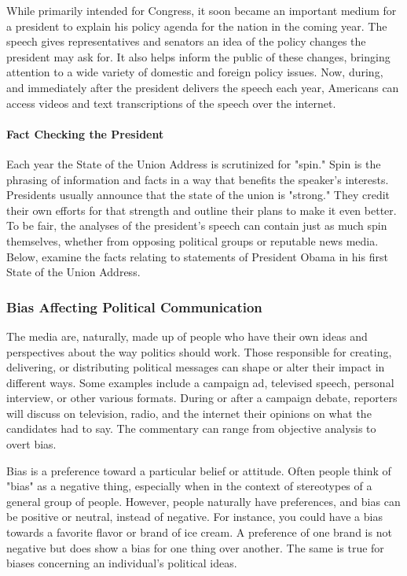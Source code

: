 While primarily intended for Congress, it soon became an important medium for a president to explain his policy agenda for the nation in the coming year. The speech gives representatives and senators an idea of the policy changes the president may ask for. It also helps inform the public of these changes, bringing attention to a wide variety of domestic and foreign policy issues. Now, during, and immediately after the president delivers the speech each year, Americans can access videos and text transcriptions of the speech over the internet.

\paragraph{Fact Checking the President} Each year the State of the Union Address is scrutinized for "spin." Spin is the phrasing of information and facts in a way that benefits the speaker's interests. Presidents usually announce that the state of the union is "strong." They credit their own efforts for that strength and outline their plans to make it even better. To be fair, the analyses of the president's speech can contain just as much spin themselves, whether from opposing political groups or reputable news media. Below, examine the facts relating to statements of President Obama in his first State of the Union Address.

\subsubsection*{Bias Affecting Political Communication}

The media are, naturally, made up of people who have their own ideas and perspectives about the way politics should work. Those responsible for creating, delivering, or distributing political messages can shape or alter their impact in different ways. Some examples include a campaign ad, televised speech, personal interview, or other various formats. During or after a campaign debate, reporters will discuss on television, radio, and the internet their opinions on what the candidates had to say. The commentary can range from objective analysis to overt bias.

Bias is a preference toward a particular belief or attitude. Often people think of "bias" as a negative thing, especially when in the context of stereotypes of a general group of people. However, people naturally have preferences, and bias can be positive or neutral, instead of negative. For instance, you could have a bias towards a favorite flavor or brand of ice cream. A preference of one brand is not negative but does show a bias for one thing over another. The same is true for biases concerning an individual's political ideas.

